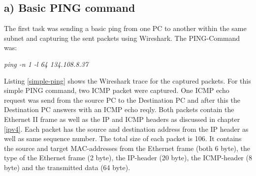 \subsection{a) Basic PING command}
\label{first-ping}
The first task was sending a basic ping from one PC to another within the same subnet and capturing the sent packets using Wireshark. The PING-Command was:
\begin{center}
	\textit{ping -n 1 -l 64 134.108.8.37}
\end{center}
Listing \ref{simple-ping} shows the Wireshark trace for the captured packets. For this simple PING command, two ICMP packet were captured. One ICMP echo request was send from the source PC to the Destination PC and after this the Destination PC answers with an ICMP echo reqly. Both packets contain the Ethernet II frame as well as the IP and ICMP headers as discussed in chapter \ref{ipv4}. Each packet has the source and destination address from the IP header as well as same sequence number. The total size of each packet is 106. It contains the source and target MAC-addresses from the Ethernet frame (both 6 byte), the type of the Ethernet frame (2 byte), the IP-header (20 byte), the ICMP-header (8 byte) and the transmitted data (64 byte).


